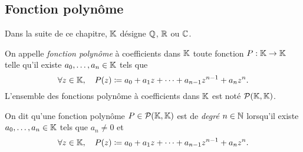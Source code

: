 \documentclass{magnoliaold}
\begin{document}
\subsection{Fonction polynôme}

Dans la suite de ce chapitre, $\mathbb{K}$ désigne $\mathbb{Q}$, $\mathbb{R}$ ou $\mathbb{C}$.

\begin{definition}
On appelle \emph{fonction polynôme} à coefficients dans $\mathbb{K}$ toute fonction
$P:\mathbb{K}\to\mathbb{K}$ telle qu'il existe $a_0,\ldots,a_n\in\mathbb{K}$ tels que
\[\forall z\in\mathbb{K},\quad P(z)\coloneqq a_0 + a_1 z + \cdots +  a_{n-1} z^{n-1} + a_n z^n.\]
L'ensemble des fonctions polynôme à coefficients dans $\mathbb{K}$ est noté $\mathcal{P}(\mathbb{K},\mathbb{K})$.
\end{definition}

\begin{remarqueUnique}
\remarque On dit qu'une fonction polynôme $P\in\mathcal{P}(\mathbb{K},\mathbb{K})$ est de \emph{degré}
  $n\in\mathbb{N}$ lorsqu'il existe $a_0,\ldots,a_n\in\mathbb{K}$ tels que $a_n\neq 0$ et
  \[\forall z\in\mathbb{K},\quad P(z)\coloneqq a_0 + a_1 z + \cdots +  a_{n-1} z^{n-1} + a_n z^n.\]
\end{remarqueUnique}
\end{document}
